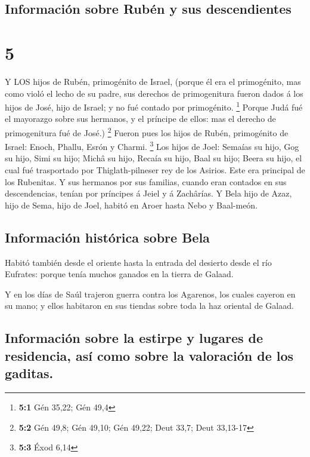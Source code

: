 \hypertarget{informaciuxf3n-sobre-rubuxe9n-y-sus-descendientes}{%
\subsection{Información sobre Rubén y sus
descendientes}\label{informaciuxf3n-sobre-rubuxe9n-y-sus-descendientes}}

\hypertarget{section-4}{%
\section{5}\label{section-4}}

 Y LOS hijos de Rubén, primogénito de Israel, (porque él era
el primogénito, mas como violó el lecho de su padre, sus derechos de
primogenitura fueron dados á los hijos de José, hijo de Israel; y no fué
contado por primogénito. \footnote{\textbf{5:1} Gén 35,22; Gén 49,4}
 Porque Judá fué el mayorazgo sobre sus hermanos, y el
príncipe de ellos: mas el derecho de primogenitura fué de José.)
\footnote{\textbf{5:2} Gén 49,8; Gén 49,10; Gén 49,22; Deut 33,7; Deut
  33,13-17}  Fueron pues los hijos de Rubén, primogénito de
Israel: Enoch, Phallu, Esrón y Charmi. \footnote{\textbf{5:3} Éxod 6,14}
 Los hijos de Joel: Semaías su hijo, Gog su hijo, Simi su
hijo;  Michâ su hijo, Recaía su hijo, Baal su hijo;
 Beera su hijo, el cual fué trasportado por
Thiglath-pilneser rey de los Asirios. Este era principal de los
Rubenitas.  Y sus hermanos por sus familias, cuando eran
contados en sus descendencias, tenían por príncipes á Jeiel y á
Zachârías.  Y Bela hijo de Azaz, hijo de Sema, hijo de Joel,
habitó en Aroer hasta Nebo y Baal-meón.

\hypertarget{informaciuxf3n-histuxf3rica-sobre-bela}{%
\subsection{Información histórica sobre
Bela}\label{informaciuxf3n-histuxf3rica-sobre-bela}}

 Habitó también desde el oriente hasta la entrada del
desierto desde el río Eufrates: porque tenía muchos ganados en la tierra
de Galaad.

 Y en los días de Saúl trajeron guerra contra los Agarenos,
los cuales cayeron en su mano; y ellos habitaron en sus tiendas sobre
toda la haz oriental de Galaad.

\hypertarget{informaciuxf3n-sobre-la-estirpe-y-lugares-de-residencia-asuxed-como-sobre-la-valoraciuxf3n-de-los-gaditas.}{%
\subsection{Información sobre la estirpe y lugares de residencia, así
como sobre la valoración de los
gaditas.}\label{informaciuxf3n-sobre-la-estirpe-y-lugares-de-residencia-asuxed-como-sobre-la-valoraciuxf3n-de-los-gaditas.}}

